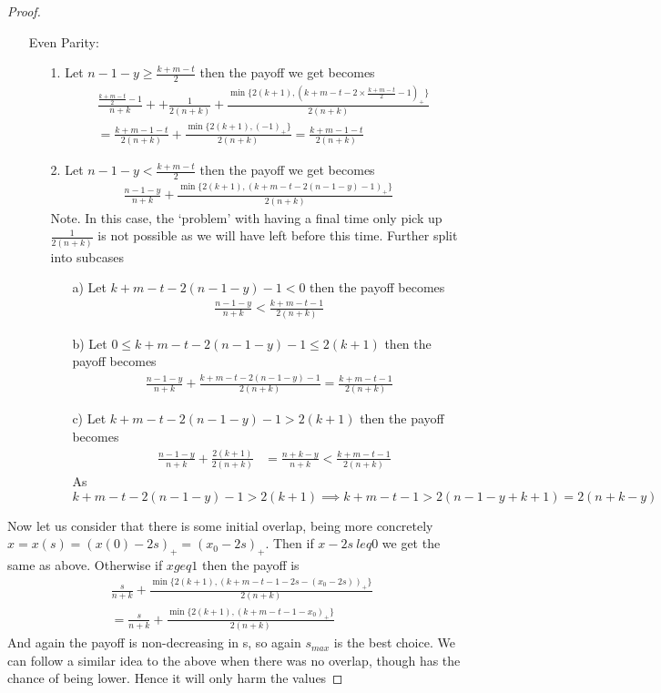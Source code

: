 \documentclass[a4paper,10pt]{article}
\newcommand{\pospart}[1]{\left( #1 \right)_{+}}
\theoremstyle{definition}
\theoremstyle{definition}
\theoremstyle{remark}
\theoremstyle{definition}
\begin{document}
\begin{proof}
\begin{itemize}
\item[Even Parity:]
\begin{itemize}
\item[1.]Let $n-1-y \geq \frac{k+m-t}{2}$ then the payoff we get becomes
\begin{align*}
&\frac{\frac{k+m-t}{2}-1}{n+k}+ +\frac{1}{2(n+k)}+\frac{\min \{ 2(k+1),\pospart{k+m-t-2 \times \frac{k+m-t}{2} -1} \}}{2(n+k)} \\
&=\frac{k+m-1-t}{2(n+k)} +\frac{\min \{ 2(k+1),\pospart{-1} \}}{2(n+k)}
=\frac{k+m-1-t}{2(n+k)}
\end{align*}
\item[2.]Let $n-1-y < \frac{k+m-t}{2}$ then the payoff we get becomes
\begin{align*}
\frac{n-1-y}{n+k}+\frac{\min \{ 2(k+1),\pospart{k+m-t-2(n-1-y)-1} \}}{2(n+k)}
\end{align*}
Note. In this case, the `problem' with having a final time only pick up $\frac{1}{2(n+k)}$ is not possible as we will have left before this time.
Further split into subcases
\begin{itemize}
\item[a)]Let $k+m-t-2(n-1-y)-1<0$ then the payoff becomes
\begin{align*}
\frac{n-1-y}{n+k}<\frac{k+m-t-1}{2(n+k)}
\end{align*}
\item[b)]Let $0 \leq k+m-t-2(n-1-y)-1 \leq 2(k+1)$ then the payoff becomes
\begin{align*}
\frac{n-1-y}{n+k} +\frac{k+m-t-2(n-1-y)-1}{2(n+k)}=\frac{k+m-t-1}{2(n+k)}
\end{align*}
\item[c)]Let $k+m-t-2(n-1-y)-1 > 2(k+1)$ then the payoff becomes
\begin{align*}
&\frac{n-1-y}{n+k}+\frac{2(k+1)}{2(n+k)}
&=\frac{n+k-y}{n+k} < \frac{k+m-t-1}{2(n+k)}
\end{align*}
As $k+m-t-2(n-1-y)-1 > 2(k+1) \implies k+m-t-1 > 2(n-1-y+k+1)=2(n+k-y)$
\end{itemize}
\end{itemize}
\end{itemize}

Now let us consider that there is some initial overlap, being more concretely $x=x(s)=\pospart{x(0)-2s}=\pospart{x_{0}-2s}$. Then if $x-2s\ leq 0$ we get the same as above.
Otherwise if $x geq 1$ then the payoff is
\begin{align*}
&\frac{s}{n+k}+\frac{\min \{ 2(k+1),\pospart{k+m-t-1-2s-(x_{0}-2s)} \}}{2(n+k)}\\
&=\frac{s}{n+k}+\frac{\min \{ 2(k+1),\pospart{k+m-t-1-x_{0}} \}}{2(n+k)}
\end{align*}
And again the payoff is non-decreasing in s, so again $s_{max}$ is the best choice.
We can follow a similar idea to the above when there was no overlap, though has the chance of being lower. Hence it will only harm the values


\end{proof}
\end{document}
